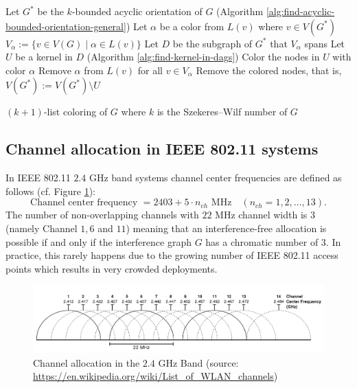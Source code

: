 \documentclass[a4paper, 12pt]{article}
\begin{document}
\begin{algorithm}[h!]\label{alg:szekeres-list-coloring}
  Let $G^*$ be the $k$-bounded acyclic orientation of $G$  (Algorithm \ref{alg:find-acyclic-bounded-orientation-general})\;
   {
  	Let $\alpha$ be a color from $L(v)$ where $v \in V(G^*)$\;
  	$V_\alpha := \lbrace v \in V(G) \mid \alpha \in L(v) \rbrace$\;
  	Let $D$ be the subgraph of $G^*$ that $V_\alpha$ spans\;
  	Let $U$ be a kernel in $D$ (Algorithm \ref{alg:find-kernel-in-dags})\;
  	Color the nodes in $U$ with color $\alpha$\;
  	Remove $\alpha$ from $L(v)$ for all $v \in V_\alpha$\;
  	Remove the colored nodes, that is, $V(G^*) := V(G^*) \setminus U$\;
  }
 \caption{$(k+1)$-list coloring of $G$ where $k$ is the Szekeres\---Wilf number of $G$}
\end{algorithm}

\subsection{Channel allocation in IEEE 802.11 systems}
In IEEE 802.11 $2.4$ GHz band systems channel center frequencies are defined as follows \cite{ieee80211} (cf. Figure \ref{fig:channel-allocation}):
$$\text{Channel center frequency } = 2403 + 5\cdot n_{ch} \text{ MHz} \quad (n_{ch} = 1,2,\ldots, 13).$$
The number of non-overlapping channels with $22$ MHz channel width is $3$ (namely Channel $1, 6$ and $11$) meaning that an interference-free allocation is possible if and only if the interference graph $G$ has a chromatic number of $3$. In practice, this rarely happens due to the growing number of IEEE 802.11 access points which results in very crowded deployments.
\begin{figure}[!h]
\centering
\includegraphics[scale=0.3]{figures/wifi-freq.png}
\caption{Channel allocation in the $2.4$ GHz Band (source: \url{https://en.wikipedia.org/wiki/List_of_WLAN_channels})}\label{fig:channel-allocation}
\end{figure}
\end{document}
